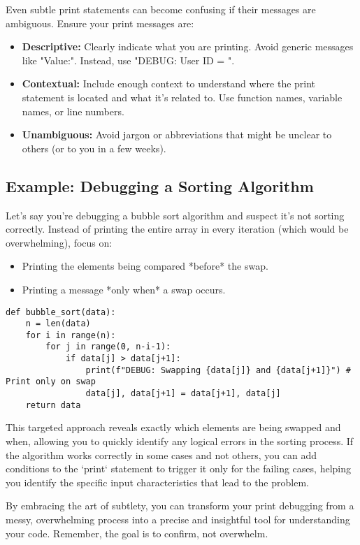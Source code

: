 \documentclass{article}
\begin{document}
{{{Even subtle print statements can become confusing if their messages are ambiguous. Ensure your print messages are:

\begin{itemize}
    \item \textbf{Descriptive:} Clearly indicate what you are printing. Avoid generic messages like "Value:". Instead, use "DEBUG: User ID = ".
    \item \textbf{Contextual:} Include enough context to understand where the print statement is located and what it's related to. Use function names, variable names, or line numbers.
    \item \textbf{Unambiguous:} Avoid jargon or abbreviations that might be unclear to others (or to you in a few weeks).
\end{itemize}

\subsection*{Example: Debugging a Sorting Algorithm}

Let's say you're debugging a bubble sort algorithm and suspect it's not sorting correctly. Instead of printing the entire array in every iteration (which would be overwhelming), focus on:

\begin{itemize}
    \item Printing the elements being compared *before* the swap.
    \item Printing a message *only when* a swap occurs.
\end{itemize}

\begin{verbatim}
def bubble_sort(data):
    n = len(data)
    for i in range(n):
        for j in range(0, n-i-1):
            if data[j] > data[j+1]:
                print(f"DEBUG: Swapping {data[j]} and {data[j+1]}") # Print only on swap
                data[j], data[j+1] = data[j+1], data[j]
    return data
\end{verbatim}

This targeted approach reveals exactly which elements are being swapped and when, allowing you to quickly identify any logical errors in the sorting process.  If the algorithm works correctly in some cases and not others, you can add conditions to the `print` statement to trigger it only for the failing cases, helping you identify the specific input characteristics that lead to the problem.

By embracing the art of subtlety, you can transform your print debugging from a messy, overwhelming process into a precise and insightful tool for understanding your code. Remember, the goal is to confirm, not overwhelm.

}}}
\end{document}
